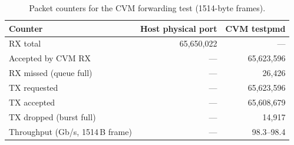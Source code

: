 \begin{table}[t]
  \centering
  \caption{Packet counters for the CVM forwarding test (1514-byte frames).}
  \label{tab:cvm-counters}
  \begin{tabular}{@{}lrr@{}}
    \toprule
    Counter & Host physical port & CVM testpmd \\
    \midrule
    RX total                       & 65,650,022 & --- \\
    Accepted by CVM RX             & ---        & 65,623,596 \\
    RX missed (queue full)         & ---        & 26,426 \\
    TX requested                   & ---        & 65,623,596 \\
    TX accepted                    & ---        & 65,608,679 \\
    TX dropped (burst full)        & ---        & 14,917 \\
    Throughput (Gb/s, 1514\,B frame) & ---      & 98.3--98.4 \\
    \bottomrule
  \end{tabular}
\end{table}
